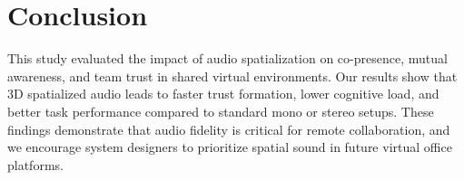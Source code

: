 \section{Conclusion}
This study evaluated the impact of audio spatialization on co-presence, mutual awareness, and team trust in shared virtual environments. Our results show that 3D spatialized audio leads to faster trust formation, lower cognitive load, and better task performance compared to standard mono or stereo setups. These findings demonstrate that audio fidelity is critical for remote collaboration, and we encourage system designers to prioritize spatial sound in future virtual office platforms.
